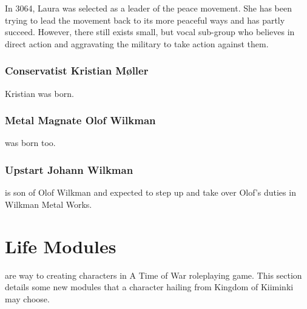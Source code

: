 \documentclass{tufte-book}
\begin{document}
In 3064, Laura was selected as a leader of the peace movement. She has been
trying to lead the movement back to its more peaceful ways and has partly
succeed. However, there still exists small, but vocal sub-group who believes
in direct action and aggravating the military to take action against them.

\subsection{Conservatist Kristian M\o ller}
\label{sc:kristian-moller}

Kristian was born.

\subsection{Metal Magnate Olof Wilkman}
\label{sc:bio-olof-wilkman}

 was born too.

\subsection{Upstart Johann Wilkman}
\label{sc:bui.johann-wilkman}

 is son of Olof Wilkman and expected to step up
and take over Olof's duties in Wilkman Metal Works.

\chapter{Life Modules}
\label{sc:life-modules}

 are way to creating characters in A Time of War
roleplaying game. This section details some new modules that a character
hailing from Kingdom of Kiiminki may choose.
\end{document}
